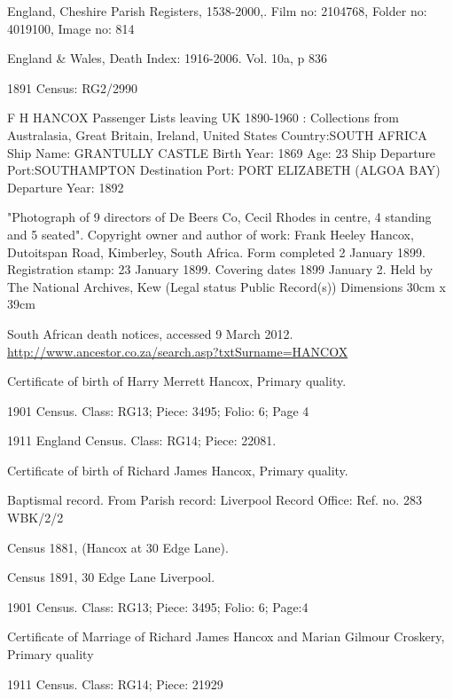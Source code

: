 \begin{thebibliography}{99}
	England, Cheshire Parish Registers, 1538-2000,.
	Film no: 2104768, Folder no: 4019100, Image no: 814

	England \& Wales, Death Index: 1916-2006.
	Vol. 10a, p 836

	 1891 Census: RG2/2990

	F H HANCOX
   	Passenger Lists leaving UK 1890-1960 : Collections from Australasia, Great Britain, Ireland, United States
	Country:SOUTH AFRICA
	Ship Name: GRANTULLY CASTLE
	Birth Year: 1869  Age: 23
	Ship Departure Port:SOUTHAMPTON
	Destination Port: PORT ELIZABETH (ALGOA BAY)
	Departure Year: 1892

	"Photograph of 9 directors of De Beers Co, Cecil Rhodes in centre, 4 standing and 5 seated".
	Copyright owner and author of work: Frank Heeley Hancox, Dutoitspan Road, Kimberley, South Africa.
	Form completed 2 January 1899. Registration stamp: 23 January 1899.
	Covering dates 1899 January 2. Held by The National Archives, Kew (Legal status Public Record(s))
	Dimensions 30cm x 39cm

	South African death notices, accessed 9 March 2012.
	\url{http://www.ancestor.co.za/search.asp?txtSurname=HANCOX}

	Certificate of birth of Harry Merrett Hancox, Primary quality.

	1901 Census. Class: RG13; Piece: 3495; Folio: 6; Page 4

	1911 England Census. Class: RG14; Piece: 22081.

	Certificate of birth of Richard James Hancox, Primary quality.

	 Baptismal record. From Parish record: Liverpool Record Office: Ref. no. 283 WBK/2/2

	Census 1881, (Hancox at 30 Edge Lane).

	Census 1891, 30 Edge Lane Liverpool.

	1901 Census. Class: RG13; Piece: 3495; Folio: 6; Page:4

	 Certificate of Marriage of Richard James Hancox and Marian Gilmour Croskery, Primary quality

	1911 Census. Class: RG14; Piece: 21929


\end{thebibliography}
